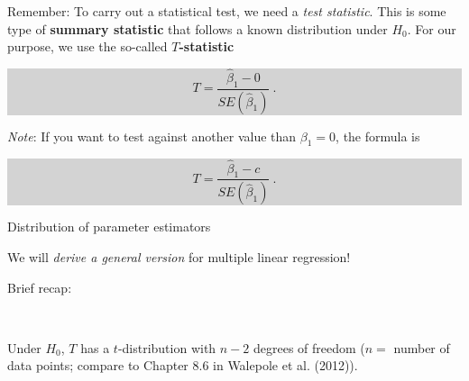 \documentclass[10pt,ignorenonframetext,]{beamer}
\begin{document}
\begin{frame}

Remember: To carry out a statistical test, we need a \emph{test
statistic}. This is some type of \textbf{summary statistic} that follows
a known distribution under \(H_0\). For our purpose, we use the
so-called \textbf{\(T\)-statistic}

\begin{center}
\colorbox{lightgray}{\begin{minipage}{5cm}
\begin{equation*}\label{eq:beta}
T=\frac{\hat\beta_1 - 0}{SE(\hat\beta_1)}\ . 
\end{equation*}
\end{minipage}}
\end{center}

\vspace{4mm} \emph{Note}: If you want to test against another value than
\(\beta_1=0\), the formula is

\begin{center}
\colorbox{lightgray}{\begin{minipage}{5cm}
\begin{equation*}
T=\frac{\hat\beta_1 - c}{SE(\hat\beta_1)} \ .
\end{equation*}
\end{minipage}}
\end{center}

\end{frame}

\begin{frame}

\begin{block}{Distribution of parameter estimators}

\vspace{2mm}

We will \emph{derive a general version} for multiple linear regression!

Brief recap:

\(~\)

Under \(H_0\), \(T\) has a \(t\)-distribution with \(n-2\) degrees of
freedom (\(n=\) number of data points; compare to Chapter 8.6 in
Walepole et al. (2012)).

\end{block}

\end{frame}
\end{document}
